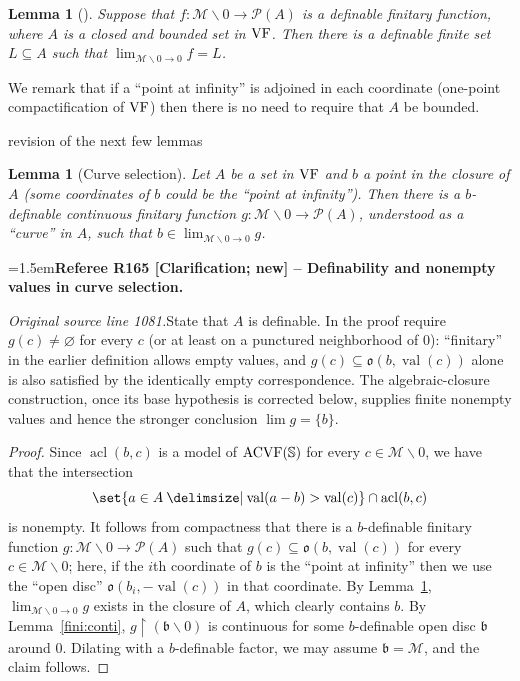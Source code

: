 \documentclass[12pt]{amsart}
\newcommand{\RefereeRemark}[4]{%
  \par\medskip\begingroup\normalfont\small\color{RefereePurple}%
  \emergencystretch=1.5em\noindent\textbf{Referee R#1 [#2] -- #3.}\par\nobreak\noindent #4\par
  \endgroup\medskip
}
\newcommand{\yimu}[1]{{\color{blue}#1}}
\theoremstyle{plain}
\newtheorem{lem}[thm]{Lemma}
\theoremstyle{definition}
\theoremstyle{remark}
\numberwithin{equation}{section}
\theoremstyle{plain}
\newcommand{\VF}{\textup{VF}}
\newcommand{\ACVF}{\textup{ACVF}}
\newcommand{\MM}{\mdl M}
\DeclareMathOperator{\acl}{acl}
\newcommand{\gb}{\mathfrak{b}}
\newcommand{\go}{\mathfrak{o}}
\newcommand{\0}{\emptyset}
\newcommand{\mdl}[1]{\mathcal{#1}}  %
\newcommand{\rest}{\upharpoonright}
\newcommand{\fun}{\longrightarrow}
\newcommand{\sub}{\subseteq}
\newcommand{\mi}{\smallsetminus}
\providecommand\given{}
\newcommand\SetSymbol[1][]{%
\nonscript \: #1 \vert
\allowbreak
\nonscript\:
\mathopen{}}
\renewcommand\given{\SetSymbol[\delimsize]}
\DeclareMathOperator{\vv}{val}
\begin{document}
\begin{lem}[{\cite[Lemma~9.5]{Yin:special:trans}}]\label{lim:exists}
Suppose that $f : \MM \mi 0 \fun \mdl P (A)$ is a definable finitary function, where $A$ is a closed and bounded set in $\VF$. Then there is a definable finite set $L \sub A$ such that $\lim_{\MM \mi 0 \rightarrow 0} f = L$.
\end{lem}

We remark that if a ``point at infinity'' is adjoined in each coordinate (one-point compactification of $\VF$)  then there is no need to require that $A$ be bounded.


\yimu{revision of the next few lemmas}

\begin{lem}[Curve selection]\label{curve:select}
Let $A$ be a set in $\VF$ and $b$ a point in the closure of $A$ (some coordinates of $b$ could be the ``point at infinity''). Then there is a $b$-definable continuous finitary function $g : \MM \mi 0 \fun \mdl P(A)$, understood as a ``curve'' in $A$, such that  $b \in \lim_{\MM \mi 0 \rightarrow 0}  g$.
\end{lem}

\RefereeRemark{165}{Clarification; new}{Definability and nonempty values in curve selection}{%
\textit{Original source line 1081.}\quad State that $A$ is definable. In the proof require $g(c)\ne\varnothing$ for every $c$ (or at least on a punctured neighborhood of $0$): ``finitary'' in the earlier definition allows empty values, and $g(c)\subseteq\go(b,\vv(c))$ alone is also satisfied by the identically empty correspondence. The algebraic-closure construction, once its base hypothesis is corrected below, supplies finite nonempty values and hence the stronger conclusion $\lim g=\{b\}$.
}
\begin{proof}
Since $\acl(b, c)$ is a model of $\ACVF(\mathbb{S})$ for every $c \in \MM \mi 0$, we have that the intersection
\[
\set{a \in A \given \vv(a - b) > \vv(c)} \cap \acl(b, c)
\]
is nonempty. It follows from compactness that there is a $b$-definable finitary function $g : \MM \mi 0 \fun \mdl P(A)$ such that $g(c) \sub \go(b, \vv(c))$ for every $c \in \MM \mi 0$; here, if the $i$th coordinate of $b$ is the ``point at infinity'' then we use the ``open disc'' $\go(b_i, -\vv(c))$ in that coordinate. By Lemma~\ref{lim:exists}, $\lim_{\MM \mi 0 \rightarrow 0} g$ exists in the  closure of $A$, which clearly contains $b$. By Lemma~\ref{fini:conti}, $g \rest (\gb \mi 0)$ is continuous for some $b$-definable open disc $\gb$ around $0$. Dilating with a $b$-definable factor, we may assume $\gb  = \MM$, and  the claim follows.
\end{proof}
\end{document}
